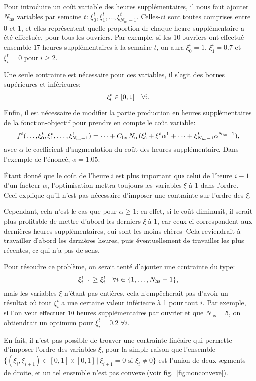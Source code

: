 Pour introduire un coût variable des heures supplémentaires, il nous faut ajouter $N_\mathrm{hs}$ variables par semaine $t$: $\xi_0^t, \xi_1^t, \dots, \xi_{N_\mathrm{hs}-1}^t$. Celles-ci sont toutes comprises entre $0$ et $1$, et elles représentent quelle proportion de chaque heure supplémentaire a été effectuée, pour tous les ouvriers.
Par exemple, si les 10 ouvriers ont effectué ensemble 17 heures supplémentaires à la semaine $t$, on aura $\xi_0^t = 1$, $\xi_1^t = 0.7$ et $\xi_i^t = 0$ pour $i \geq 2$.

Une seule contrainte est nécessaire pour ces variables, il s'agit des bornes supérieures et inférieures:
\[
    \xi_i^t \in [0, 1]
    \quad\forall i
    \text.
\]

Enfin, il est nécessaire de modifier la partie \og{}production en heures supplémentaires\fg{} de la fonction-objectif pour prendre en compte le coût variable:
\[
    f^t(\dots, \xi_0^t, \xi_1^t, \dots, \xi_{N_\mathrm{hs}-1}^t)
    = \dots + C_\mathrm{hs}\,N_\mathrm{o}\,(\xi_0^t + \xi_1^t \alpha^1 + \dots + \xi_{N_\mathrm{hs}-1}^t \alpha^{N_\mathrm{hs}-1})
    \text,
\]
avec $\alpha$ le coefficient d'augmentation du coût des heures supplémentaire. Dans l'exemple de l'énoncé, $\alpha = 1.05$.

Étant donné que le coût de l'heure $i$ est plus important que celui de l'heure $i-1$ d'un facteur $\alpha$, l'optimisation mettra toujours les variables $\xi$ à 1 dans l'ordre. Ceci explique qu'il n'est pas nécessaire d'imposer une contrainte sur l'ordre des $\xi$.

Cependant, cela n'est le cas que pour $\alpha \geq 1$: en effet, si le coût diminuait, il serait plus profitable de mettre d'abord les derniers $\xi$ à 1, car ceux-ci correspondent aux dernières heures supplémentaires, qui sont les moins chères. Cela reviendrait à travailler d'abord les dernières heures, puis éventuellement de travailler les plus récentes, ce qui n'a pas de sens.

Pour résoudre ce problème, on serait tenté d'ajouter une contrainte du type:
\[
    \xi_{i-1}^t \geq \xi_i^t \quad\forall i \in \{1,\dots, N_\mathrm{hs}-1\}
    \text,
\]
mais les variables $\xi$ n'étant pas entières, cela n'empêcherait pas d'avoir un résultat où tout $\xi_i^t$ a une certaine valeur inférieure à 1 pour tout $i$. Par exemple, si l'on veut effectuer 10 heures supplémentaires par ouvrier et que $N_\mathrm{hs} = 5$, on obtiendrait un optimum pour $\xi_i^t = 0.2 \;\forall i$.

En fait, il n'est pas possible de trouver une contrainte linéaire qui permette d'imposer l'ordre des variables $\xi$, pour la simple raison que l'ensemble $\{(\xi_i, \xi_{i+1}) \in [0, 1]\!\times\![0, 1] \,|\, \xi_{i+1} = 0 \text{ si } \xi_i \neq 0\}$ est l'union de deux segments de droite, et un tel ensemble n'est pas convexe (voir fig.~\ref{fig:nonconvexe}).


